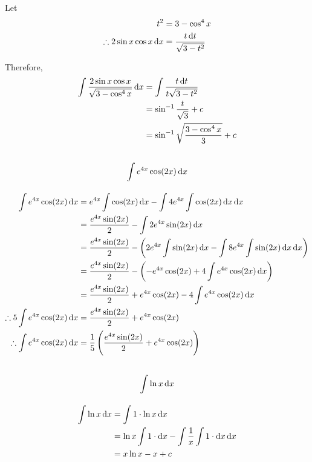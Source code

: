 \documentclass[fleqn, a4paper]{article}
\begin{document}
Let
\begin{align*}
	t^2 &= 3 - \cos^4 x\\
	\therefore 2 \sin x \cos x \dif x &= \dfrac{t \dif t}{\sqrt{3 - t^2}}
\end{align*}

Therefore,
\begin{align*}
	\int \dfrac{2 \sin x \cos x}{\sqrt{3 - \cos^4 x}} \dif x &= \int \dfrac{t \dif t}{t \sqrt{3 - t^2}}\\
	&= \sin^{-1} \dfrac{t}{\sqrt{3}} + c\\
	&= \sin^{-1} \sqrt{\dfrac{3 - \cos^4 x}{3}} + c
\end{align*}

\subsection{\[\int e^{4x} \cos (2x) \dif x\]}

\begin{align*}
	\int e^{4x} \cos (2x) \dif x &= e^{4x} \int \cos (2x) \dif x - \int 4e^{4x} \int \cos (2x) \dif x \dif x\\
	&= \dfrac{e^{4x} \sin (2x)}{2} - \int 2e^{4x} \sin (2x) \dif x\\
	&= \dfrac{e^{4x} \sin (2x)}{2} - \left( 2e^{4x} \int \sin(2x) \dif x - \int 8e^{4x} \int \sin (2x) \dif x \dif x \right)\\
	&= \dfrac{e^{4x} \sin (2x)}{2} - \left( - e^{4x} \cos(2x) + 4 \int e^{4x} \cos (2x) \dif x \right)\\
	&= \dfrac{e^{4x} \sin (2x)}{2} + e^{4x} \cos(2x) - 4 \int e^{4x} \cos (2x) \dif x\\
	\therefore 5 \int e^{4x} \cos (2x) \dif x &= \dfrac{e^{4x} \sin (2x)}{2} + e^{4x} \cos (2x)\\
	\therefore \int e^{4x} \cos (2x) \dif x &= \dfrac{1}{5} \left( \dfrac{e^{4x} \sin (2x)}{2} + e^{4x} \cos (2x) \right)\\
\end{align*}

\subsection{\[\int \ln x \dif x\]}

\begin{align*}
	\int \ln x \dif x &= \int 1 \cdot \ln x \dif x\\
	&= \ln x \int 1 \cdot \dif x - \int \dfrac{1}{x} \int 1 \cdot \dif x \dif x\\
	&= x \ln x - x + c
\end{align*}
\end{document}
